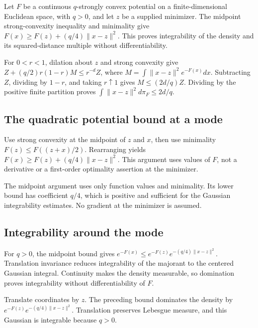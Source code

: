 \documentclass[11pt,a4paper]{article}
\begin{document}
Let \(F\) be a continuous \(q\)-strongly convex potential on a finite-dimensional Euclidean space, with \(q>0\), and let \(z\) be a supplied minimizer. The midpoint strong-convexity inequality and minimality give \(F(x)\ge F(z)+(q/4)\|x-z\|^2\). This proves integrability of the density and its squared-distance multiple without differentiability.



For \(0<r<1\), dilation about \(z\) and strong convexity give \(Z+(q/2)r(1-r)M\le r^{-d}Z\), where \(M=\int\|x-z\|^2e^{-F(x)}dx\). Subtracting \(Z\), dividing by \(1-r\), and taking \(r\uparrow1\) gives \(M\le(2d/q)Z\). Dividing by the positive finite partition proves \(\int\|x-z\|^2d\pi_F\le2d/q\).


\subsection{\texorpdfstring{The quadratic potential bound at a mode}{The quadratic potential bound at a mode}}


Use strong convexity at the midpoint of \(z\) and \(x\), then use minimality \(F(z)\le F((z+x)/2)\). Rearranging yields \(F(x)\ge F(z)+(q/4)\|x-z\|^2\). This argument uses values of \(F\), not a derivative or a first-order optimality assertion at the minimizer.



The midpoint argument uses only function values and minimality. Its lower bound has coefficient \(q/4\), which is positive and sufficient for the Gaussian integrability estimates. No gradient at the minimizer is assumed.


\subsection{\texorpdfstring{Integrability around the mode}{Integrability around the mode}}


For \(q>0\), the midpoint bound gives \(e^{-F(x)}\le e^{-F(z)}e^{-(q/4)\|x-z\|^2}\). Translation invariance reduces integrability of the majorant to the centered Gaussian integral. Continuity makes the density measurable, so domination proves integrability without differentiability of \(F\).



Translate coordinates by \(z\). The preceding bound dominates the density by \(e^{-F(z)}e^{-(q/4)\|x-z\|^2}\). Translation preserves Lebesgue measure, and this Gaussian is integrable because \(q>0\).
\end{document}
